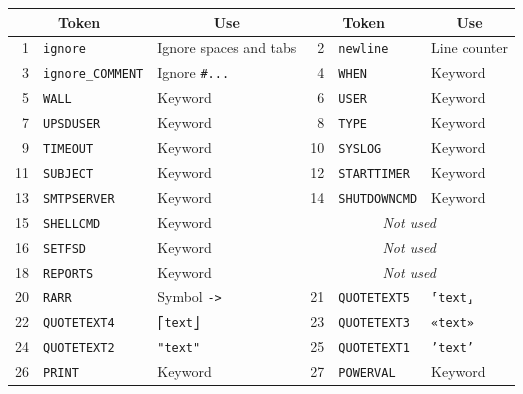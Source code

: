 \documentclass[12pt]{article}
\begin{document}
\begin{description}
\begin{figure}[ht]
\begin{center}
\begin{tabular}{|r|l|p{0.17\LinePrinterwidth}||r|l|p{0.32\LinePrinterwidth}|}
\hline
\multicolumn{2}{|c|}{\textbf{Token}} & \multicolumn{1}{|c||}{\textbf{Use}} &
\multicolumn{2}{|c|}{\textbf{Token}} & \multicolumn{1}{|c|}{\textbf{Use}} \\ \hline\hline
 1 & \texttt{ignore}          & Ignore spaces and tabs &  
 2 & \texttt{newline}         & Line counter          \\ \hline 
 3 & \texttt{ignore\_COMMENT} & Ignore \texttt{\#...} &  
 4 & \texttt{WHEN}            & Keyword               \\ \hline
 5 & \texttt{WALL}            & Keyword               &
 6 & \texttt{USER}            & Keyword               \\ \hline
 7 & \texttt{UPSDUSER}        & Keyword               &
 8 & \texttt{TYPE}            & Keyword               \\ \hline
 9 & \texttt{TIMEOUT}         & Keyword               &
10 & \texttt{SYSLOG}          & Keyword               \\ \hline
11 & \texttt{SUBJECT}         & Keyword               &
12 & \texttt{STARTTIMER}      & Keyword               \\ \hline
13 & \texttt{SMTPSERVER}      & Keyword               &
14 & \texttt{SHUTDOWNCMD}     & Keyword               \\ \hline
15 & \texttt{SHELLCMD}        & Keyword               &
\multicolumn{3}{|c|}{\textit{Not used}}               \\ \hline
16 & \texttt{SETFSD}          & Keyword               &
\multicolumn{3}{|c|}{\textit{Not used}}               \\ \hline
18 & \texttt{REPORTS}         & Keyword               &
\multicolumn{3}{|c|}{\textit{Not used}}               \\ \hline
20 & \texttt{RARR}            & Symbol \texttt{->}    &
21 & \texttt{QUOTETEXT5}      & \texttt{⸢text⸥}       \\ \hline
22 & \texttt{QUOTETEXT4}      & \texttt{⎡text⎦}       &
23 & \texttt{QUOTETEXT3}      & \texttt{«text»}       \\ \hline
24 & \texttt{QUOTETEXT2}      & \texttt{"text"}       &
25 & \texttt{QUOTETEXT1}      & \texttt{'text'}       \\ \hline
26 & \texttt{PRINT}           & Keyword               &
27 & \texttt{POWERVAL}        & Keyword               \\ \hline

\end{tabular}
\end{center}
\end{figure}
\end{description}
\end{document}
